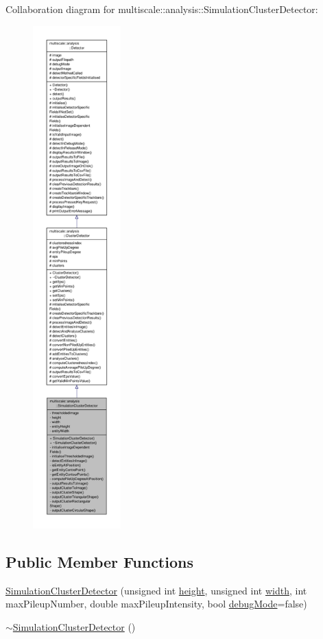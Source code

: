 Collaboration diagram for multiscale\-:\-:analysis\-:\-:Simulation\-Cluster\-Detector\-:\nopagebreak
\begin{figure}[H]
\begin{center}
\leavevmode
\includegraphics[height=550pt]{classmultiscale_1_1analysis_1_1SimulationClusterDetector__coll__graph}
\end{center}
\end{figure}
\subsection*{Public Member Functions}
\begin{DoxyCompactItemize}
\item 
\hyperlink{classmultiscale_1_1analysis_1_1SimulationClusterDetector_a5ec24468129dfa9b6a7f38e11a78c69b}{Simulation\-Cluster\-Detector} (unsigned int \hyperlink{classmultiscale_1_1analysis_1_1SimulationClusterDetector_a9d0a0fe5d9ea0f2516d07bf44b1da257}{height}, unsigned int \hyperlink{classmultiscale_1_1analysis_1_1SimulationClusterDetector_a4c66a82aa1749dce31c767bc4008d904}{width}, int max\-Pileup\-Number, double max\-Pileup\-Intensity, bool \hyperlink{classmultiscale_1_1analysis_1_1Detector_a4b42f796957efd6ee0b8cf7645494a65}{debug\-Mode}=false)
\item 
\hyperlink{classmultiscale_1_1analysis_1_1SimulationClusterDetector_a8df6b5abd6d2dd48e691bf999d35dd43}{$\sim$\-Simulation\-Cluster\-Detector} ()
\end{DoxyCompactItemize}
